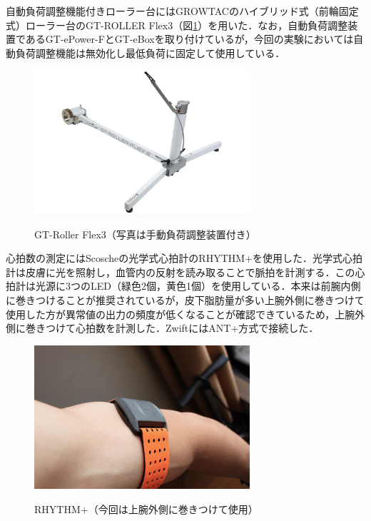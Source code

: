 自動負荷調整機能付きローラー台にはGROWTACのハイブリッド式（前輪固定式）ローラー台のGT-ROLLER Flex3（図\ref{fig:gt-roller_flex3}）を用いた．なお，自動負荷調整装置であるGT-ePower-FとGT-eBoxを取り付けているが，今回の実験においては自動負荷調整機能は無効化し最低負荷に固定して使用している．

\begin{figure}[h]
  \begin{center}
    \label{fig:gt-roller_flex3}
    \includegraphics[width=8cm]{fig/gt-roller_flex3}
    \caption{GT-Roller Flex3（写真は手動負荷調整装置付き）}
  \end{center}
\end{figure}

心拍数の測定にはScoscheの光学式心拍計のRHYTHM+を使用した．光学式心拍計は皮膚に光を照射し，血管内の反射を読み取ることで脈拍を計測する．この心拍計は光源に3つのLED（緑色2個，黄色1個）を使用している．本来は前腕内側に巻きつけることが推奨されているが，皮下脂肪量が多い上腕外側に巻きつけて使用した方が異常値の出力の頻度が低くなることが確認できているため，上腕外側に巻きつけて心拍数を計測した．ZwiftにはANT+方式で接続した．

\begin{figure}[h]
  \begin{center}
    \label{fig:rhythm}
    \includegraphics[width=8cm]{fig/rhythm}
    \caption{RHYTHM+（今回は上腕外側に巻きつけて使用）}
  \end{center}
\end{figure}

